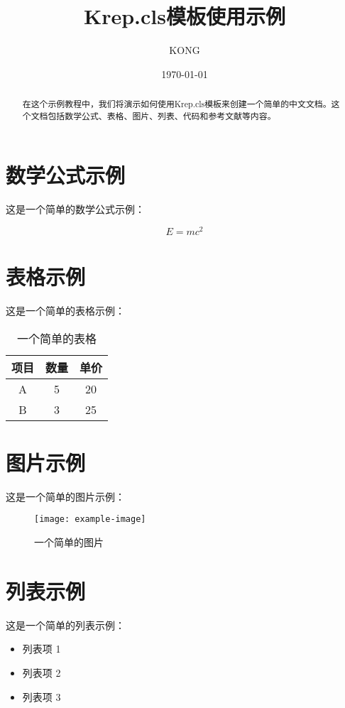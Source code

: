 \documentclass{Krep}
\title{Krep.cls模板使用示例}
\author{KONG}
\date{\today}
\begin{document}
\maketitle
\begin{abstract}
	在这个示例教程中，我们将演示如何使用Krep.cls模板来创建一个简单的中文文档。这个文档包括数学公式、表格、图片、列表、代码和参考文献等内容。
\end{abstract}
\section{数学公式示例}

这是一个简单的数学公式示例：

\begin{equation}
	E = mc^2
\end{equation}
\section{表格示例}

这是一个简单的表格示例：

\begin{table}[h]
	\centering
	\begin{tabular}{|c|c|c|}
		\hline
		项目 & 数量 & 单价 \\
		\hline
		A    & 5   & 20   \\
		\hline
		B    & 3   & 25   \\
		\hline
	\end{tabular}
	\caption{一个简单的表格}
\end{table}
\section{图片示例}

这是一个简单的图片示例：

\begin{figure}[h]
	\centering
	\texttt{[image: example-image]}
	\caption{一个简单的图片}
\end{figure}
\section{列表示例}

这是一个简单的列表示例：

\begin{itemize}
	\item 列表项 1
	\item 列表项 2
	\item 列表项 3
\end{itemize}
\end{document}
